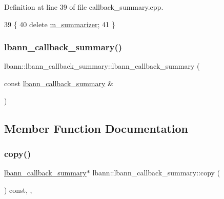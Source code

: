Definition at line 39 of file callback\+\_\+summary.\+cpp.


\begin{DoxyCode}
39                                                 \{
40   \textcolor{keyword}{delete} \hyperlink{classlbann_1_1lbann__callback_a277d46138184f85f161a8263b8322c76}{m\_summarizer};
41 \}
\end{DoxyCode}
\mbox{\label{classlbann_1_1lbann__callback__summary_aed7ed143ba18927124e76f6442228810}} 
\subsubsection{\texorpdfstring{lbann\+\_\+callback\+\_\+summary()}{lbann\_callback\_summary()}\hspace{0.1cm}{\footnotesize\ttfamily [2/2]}}
{\footnotesize\ttfamily lbann\+::lbann\+\_\+callback\+\_\+summary\+::lbann\+\_\+callback\+\_\+summary (\begin{DoxyParamCaption}\item[{const \hyperlink{classlbann_1_1lbann__callback__summary}{lbann\+\_\+callback\+\_\+summary} \&}]{ }\end{DoxyParamCaption})\hspace{0.3cm}{\ttfamily [default]}}



\subsection{Member Function Documentation}
\mbox{\label{classlbann_1_1lbann__callback__summary_ae6f1ba60d92f4599361ce5bd5f70caa7}} 
\subsubsection{\texorpdfstring{copy()}{copy()}}
{\footnotesize\ttfamily \hyperlink{classlbann_1_1lbann__callback__summary}{lbann\+\_\+callback\+\_\+summary}$\ast$ lbann\+::lbann\+\_\+callback\+\_\+summary\+::copy (\begin{DoxyParamCaption}{ }\end{DoxyParamCaption}) const\hspace{0.3cm}{\ttfamily [inline]}, {\ttfamily [override]}, {\ttfamily [virtual]}}



